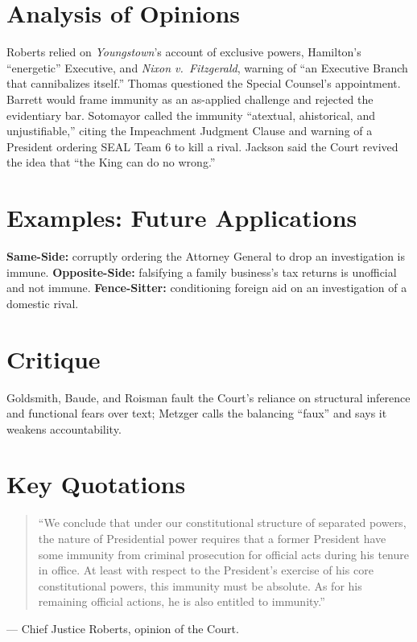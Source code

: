 \documentclass[12pt]{article}
\begin{document}
\section{Analysis of Opinions}
Roberts relied on \textit{Youngstown}'s account of exclusive powers, Hamilton's ``energetic'' Executive, and \textit{Nixon v.\ Fitzgerald}, warning of ``an Executive Branch that cannibalizes itself.'' Thomas questioned the Special Counsel's appointment. Barrett would frame immunity as an as-applied challenge and rejected the evidentiary bar. Sotomayor called the immunity ``atextual, ahistorical, and unjustifiable,'' citing the Impeachment Judgment Clause and warning of a President ordering SEAL Team 6 to kill a rival. Jackson said the Court revived the idea that ``the King can do no wrong.''

\section{Examples: Future Applications}
\textbf{Same-Side:} corruptly ordering the Attorney General to drop an investigation is immune. \textbf{Opposite-Side:} falsifying a family business's tax returns is unofficial and not immune. \textbf{Fence-Sitter:} conditioning foreign aid on an investigation of a domestic rival.

\section{Critique}
Goldsmith, Baude, and Roisman fault the Court's reliance on structural inference and functional fears over text; Metzger calls the balancing ``faux'' and says it weakens accountability.

\section{Key Quotations}
\begin{quote}
``We conclude that under our constitutional structure of separated powers, the nature of Presidential power requires that a former President have some immunity from criminal prosecution for official acts during his tenure in office. At least with respect to the President's exercise of his core constitutional powers, this immunity must be absolute. As for his remaining official actions, he is also entitled to immunity.''
\end{quote}
\noindent --- Chief Justice Roberts, opinion of the Court.
\end{document}
